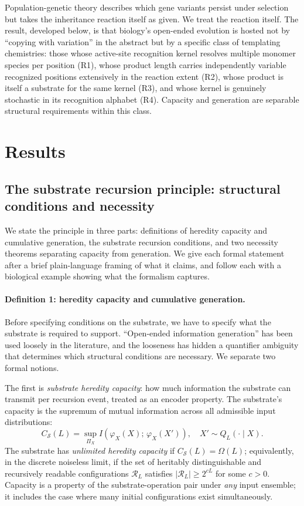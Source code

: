 \documentclass[aps,prx,reprint,amsmath,amssymb,floatfix,superscriptaddress,nofootinbib]{revtex4-2}
\theoremstyle{plain-thm}
\theoremstyle{definition-thm}
\newcommand{\Csub}{C_{\mathcal{S}}}
\newcommand{\descX}{\varphi_X}
\newcommand{\Reach}{\mathcal{R}}
\begin{document}
Population-genetic theory describes which gene variants persist under selection but takes the inheritance reaction itself as given. We treat the reaction itself. The result, developed below, is that biology's open-ended evolution is hosted not by ``copying with variation'' in the abstract but by a specific class of templating chemistries: those whose active-site recognition kernel resolves multiple monomer species per position (R1), whose product length carries independently variable recognized positions extensively in the reaction extent (R2), whose product is itself a substrate for the same kernel (R3), and whose kernel is genuinely stochastic in its recognition alphabet (R4). Capacity and generation are separable structural requirements within this class.


\section{Results}

\subsection{The substrate recursion principle: structural conditions and necessity}

We state the principle in three parts: definitions of heredity capacity and cumulative generation, the substrate recursion conditions, and two necessity theorems separating capacity from generation. We give each formal statement after a brief plain-language framing of what it claims, and follow each with a biological example showing what the formalism captures.

\paragraph{Definition 1: heredity capacity and cumulative generation.}

Before specifying conditions on the substrate, we have to specify what the substrate is required to support. ``Open-ended information generation'' has been used loosely in the literature, and the looseness has hidden a quantifier ambiguity that determines which structural conditions are necessary. We separate two formal notions.

The first is \emph{substrate heredity capacity}: how much information the substrate can transmit per recursion event, treated as an encoder property. The substrate's capacity is the supremum of mutual information across all admissible input distributions:
\begin{equation}
\Csub(L) = \sup_{\Pi_X} I\!\left(\descX(X);\, \descX(X')\right), \quad X' \sim Q_L(\cdot \mid X).
\label{eq:capacity}
\end{equation}
The substrate has \emph{unlimited heredity capacity} if $\Csub(L) = \Omega(L)$; equivalently, in the discrete noiseless limit, if the set of heritably distinguishable and recursively readable configurations $\Reach_L$ satisfies $|\Reach_L| \ge 2^{cL}$ for some $c > 0$. Capacity is a property of the substrate-operation pair under \emph{any} input ensemble; it includes the case where many initial configurations exist simultaneously.
\end{document}
